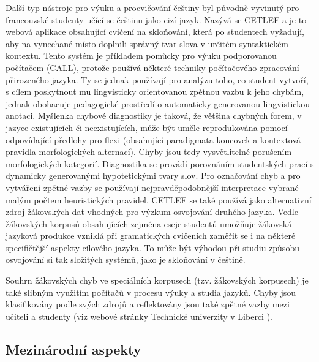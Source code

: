 \begin{multicols}{2}
Další typ nástroje pro výuku a procvičování češtiny byl původně vyvinutý pro francouzské studenty učící se češtinu jako cizí jazyk. Nazývá se CETLEF \cite{Note9cs} a je to webová aplikace obsahující cvičení na skloňování, která po studentech vyžadují, aby na vynechané místo doplnili správný tvar slova v určitém syntaktickém kontextu. Tento systém je příkladem pomůcky pro výuku podporovanou počítačem (CALL), protože používá některé techniky počítačového zpracování přirozeného jazyka. Ty se jednak používají pro analýzu toho, co student vytvoří, s cílem poskytnout mu lingvisticky orientovanou zpětnou vazbu k jeho chybám, jednak obohacuje pedagogické prostředí o automaticky generovanou lingvistickou anotaci. Myšlenka chybové diagnostiky je taková, že většina chybných forem, v jazyce existujících či neexistujících, může být uměle reprodukována pomocí odpovídající předlohy pro flexi (obsahující paradigmata koncovek a kontextová pravidla morfologických alternací). Chyby jsou tedy vysvětlitelné porušením morfologických kategorií. Diagnostika se provádí porovnáním studentských prací s dynamicky generovanými hypotetickými tvary slov. Pro označování chyb a pro vytváření zpětné vazby se používají nejpravděpodobnější interpretace vybrané malým počtem heuristických pravidel. CETLEF se také používá jako alternativní zdroj žákovských dat vhodných pro výzkum osvojování druhého jazyka. Vedle žákovských korpusů obsahujících zejména eseje studentů umožňuje žákovská jazyková produkce vzniklá při gramatických cvičeních zaměřit se i na některé specifičtější aspekty cílového jazyka. To může být výhodou při studiu způsobu osvojování si tak složitých systémů, jako je skloňování v češtině.

Souhrn žákovských chyb ve speciálních korpusech (tzv. žákovských korpusech) je také slibným využitím počítačů v procesu výuky a studia jazyků. Chyby jsou klasifikovány podle svých zdrojů a reflektovány jsou také zpětné vazby mezi učiteli a studenty (viz webové stránky Technické univerzity v Liberci \cite{Note10}).

\subsection{Mezinárodní aspekty}


\end{multicols}
